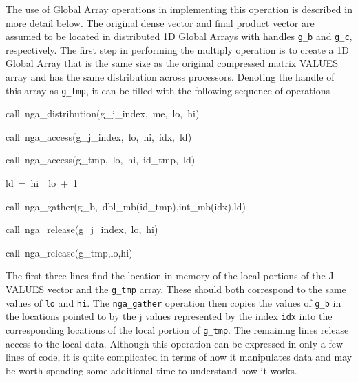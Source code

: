 The use of Global Array operations in implementing this operation
is described in more detail below. The original dense vector and final
product vector are assumed to be located in distributed 1D Global
Arrays with handles \texttt{g\_b} and \texttt{g\_c}, respectively.
The first step in performing the multiply operation is to create a
1D Global Array that is the same size as the original compressed matrix
VALUES array and has the same distribution across processors. Denoting
the handle of this array as \texttt{g\_tmp}, it can be filled with
the following sequence of operations
\begin{lyxcode}
call~nga\_distribution(g\_j\_index,~me,~lo,~hi)~

call~nga\_access(g\_j\_index,~lo,~hi,~idx,~ld)~

call~nga\_access(g\_tmp,~lo,~hi,~id\_tmp,~ld)~

ld~=~hi~\textendash{}~lo~+~1~

call~nga\_gather(g\_b,~dbl\_mb(id\_tmp),int\_mb(idx),ld)~

call~nga\_release(g\_j\_index,~lo,~hi)~

call~nga\_release(g\_tmp,lo,hi)
\end{lyxcode}
The first three lines find the location in memory of the local portions
of the J-VALUES vector and the \texttt{g\_tmp} array. These should
both correspond to the same values of \texttt{lo} and \texttt{hi}.
The \texttt{nga\_gather} operation then copies the values of \texttt{g\_b}
in the locations pointed to by the j values represented by the index
\texttt{idx} into the corresponding locations of the local portion
of \texttt{g\_tmp}. The remaining lines release access to the local
data. Although this operation can be expressed in only a few lines
of code, it is quite complicated in terms of how it manipulates data
and may be worth spending some additional time to understand how it
works.

